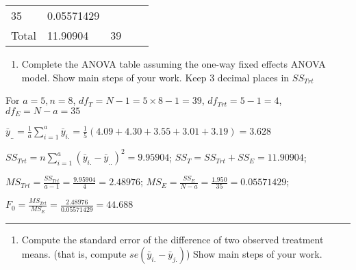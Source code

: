 \documentclass[]{article}
\providecommand{\tightlist}{%
  \setlength{\itemsep}{0pt}\setlength{\parskip}{0pt}}
\begin{document}
\begin{longtable}[]{@{}lllll@{}}
\begin{minipage}[t]{0.17\columnwidth}
35\strut
\end{minipage} & \begin{minipage}[t]{0.17\columnwidth}\raggedright
0.05571429\strut
\end{minipage} & \begin{minipage}[t]{0.17\columnwidth}\raggedright
\strut
\end{minipage}\tabularnewline
\begin{minipage}[t]{0.17\columnwidth}\raggedright
Total\strut
\end{minipage} & \begin{minipage}[t]{0.17\columnwidth}\raggedright
11.90904\strut
\end{minipage} & \begin{minipage}[t]{0.17\columnwidth}\raggedright
39\strut
\end{minipage} & \begin{minipage}[t]{0.17\columnwidth}\raggedright
\strut
\end{minipage} & \begin{minipage}[t]{0.17\columnwidth}\raggedright
\strut
\end{minipage}\tabularnewline
\bottomrule
\end{longtable}

\begin{enumerate}
\def\labelenumi{(\alph{enumi})}
\tightlist
\item
  Complete the ANOVA table assuming the one-way fixed effects ANOVA
  model. Show main steps of your work. Keep 3 decimal places in
  \(SS_{Trt}\)
\end{enumerate}

For \(a=5,n=8\), \(df_T=N-1=5\times8-1=39\), \(df_{Trt}=5-1=4\),
\(df_E=N-a=35\)

\(\bar y_{..}=\frac{1}a\sum^a_{i=1}\bar y_{i.}=\frac{1}5(4.09+4.30+3.55+3.01+3.19)=3.628\)

\(SS_{Trt}=n\sum^a_{i=1}(\bar y_{i.}−\bar y_{..})^2=9.95904\);
\(SS_{T}=SS_{Trt}+SS_{E}=11.90904\);

\(MS_{Trt}=\frac{SS_{Trt}}{a-1}=\frac{9.95904}4=2.48976\);
\(MS_{E}=\frac{SS_{E}}{N-a}=\frac{1.950}{35}=0.05571429\);

\(F_{0}=\frac{MS_{Trt}}{MS_{E}}=\frac{2.48976}{0.05571429}=44.688\)

\begin{center}\rule{0.5\linewidth}{\linethickness}\end{center}

\begin{enumerate}
\def\labelenumi{(\alph{enumi})}
\setcounter{enumi}{1}
\tightlist
\item
  Compute the standard error of the difference of two observed treatment
  means. (that is, compute \(se(\bar y _{i.}-\bar y_{j.})\)) Show main
  steps of your work.
\end{enumerate}
\end{document}
